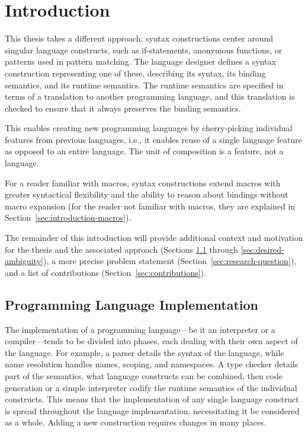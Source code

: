 \documentclass{kththesis}
\begin{document}
\tableofcontents


\mainmatter

\chapter{Introduction} \label{sec:introduction}


This thesis takes a different approach: syntax constructions center around singular language constructs, such as if-statements, anonymous functions, or patterns used in pattern matching. The language designer defines a syntax construction representing one of these, describing its syntax, its binding semantics, and its runtime semantics. The runtime semantics are specified in terms of a translation to another programming language, and this translation is checked to ensure that it always preserves the binding semantics.

This enables creating new programming languages by cherry-picking individual features from previous languages, i.e., it enables reuse of a single language feature as opposed to an entire language. The unit of composition is a feature, not a language.

For a reader familiar with macros, syntax constructions extend macros with greater syntactical flexibility and the ability to reason about bindings without macro expansion (for the reader not familiar with macros, they are explained in Section~\ref{sec:introduction-macros}).

The remainder of this introduction will provide additional context and motivation for the thesis and the associated approach (Sections \ref{sec:compiler-design} through \ref{sec:desired-ambiguity}), a more precise problem statement (Section~\ref{sec:research-question}), and a list of contributions (Section~\ref{sec:contributions}).

\section{Programming Language Implementation} \label{sec:compiler-design}

The implementation of a programming language---be it an interpreter or a compiler---tends to be divided into phases, each dealing with their own aspect of the language. For example, a parser details the syntax of the language, while name resolution handles names, scoping, and namespaces. A type checker details part of the semantics, what language constructs can be combined, then code generation or a simple interpreter codify the runtime semantics of the individual constructs. This means that the implementation of any single language construct is spread throughout the language implementation, necessitating it be considered as a whole. Adding a new construction requires changes in many places.
\end{document}
